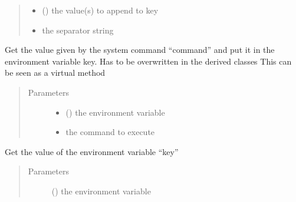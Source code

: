 \documentclass[a4paper,10pt,english]{sphinxmanual}
\begin{document}
\begin{fulllineitems}
\begin{fulllineitems}
\begin{quote}
\begin{description}
\begin{itemize}
\item {} 
 () \textendash{} the value(s) to append to key

\item {} 
 \textendash{} the separator string

\end{itemize}

\end{description}\end{quote}

\end{fulllineitems}


\begin{fulllineitems}
\label{\detokenize{commands/apidoc/src:src.fileEnviron.ScreenEnviron.command_value}}
Get the value given by the system command “command” 
and put it in the environment variable key.
Has to be overwritten in the derived classes
This can be seen as a virtual method
\begin{quote}\begin{description}
\item[{Parameters}] \leavevmode\begin{itemize}
\item {} 
 () \textendash{} the environment variable

\item {} 
 \textendash{} the command to execute

\end{itemize}

\end{description}\end{quote}

\end{fulllineitems}


\begin{fulllineitems}
\label{\detokenize{commands/apidoc/src:src.fileEnviron.ScreenEnviron.get}}
Get the value of the environment variable “key”
\begin{quote}\begin{description}
\item[{Parameters}] \leavevmode
{} () \textendash{} the environment variable


\end{description}
\end{quote}
\end{fulllineitems}
\end{fulllineitems}
\end{document}
